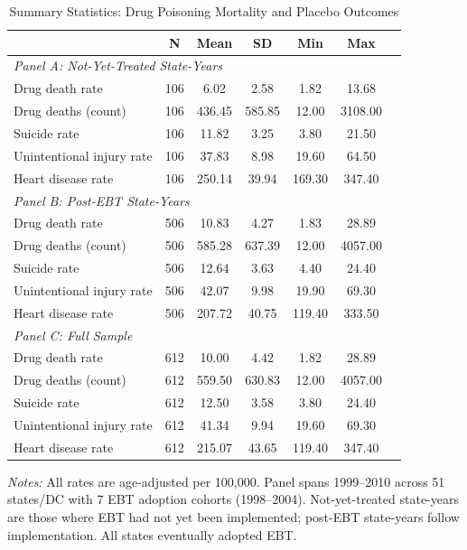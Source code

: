 \begin{table}[H]
\centering
\caption{Summary Statistics: Drug Poisoning Mortality and Placebo Outcomes}
\label{tab:summary}
\small
\begin{threeparttable}
\begin{tabular}{lcccccc}
\toprule
& N & Mean & SD & Min & Max \\
\midrule
\multicolumn{6}{l}{\textit{Panel A: Not-Yet-Treated State-Years}} \\
Drug death rate & 106 & 6.02 & 2.58 & 1.82 & 13.68 \\
Drug deaths (count) & 106 & 436.45 & 585.85 & 12.00 & 3108.00 \\
Suicide rate & 106 & 11.82 & 3.25 & 3.80 & 21.50 \\
Unintentional injury rate & 106 & 37.83 & 8.98 & 19.60 & 64.50 \\
Heart disease rate & 106 & 250.14 & 39.94 & 169.30 & 347.40 \\
\midrule
\multicolumn{6}{l}{\textit{Panel B: Post-EBT State-Years}} \\
Drug death rate & 506 & 10.83 & 4.27 & 1.83 & 28.89 \\
Drug deaths (count) & 506 & 585.28 & 637.39 & 12.00 & 4057.00 \\
Suicide rate & 506 & 12.64 & 3.63 & 4.40 & 24.40 \\
Unintentional injury rate & 506 & 42.07 & 9.98 & 19.90 & 69.30 \\
Heart disease rate & 506 & 207.72 & 40.75 & 119.40 & 333.50 \\
\midrule
\multicolumn{6}{l}{\textit{Panel C: Full Sample}} \\
Drug death rate & 612 & 10.00 & 4.42 & 1.82 & 28.89 \\
Drug deaths (count) & 612 & 559.50 & 630.83 & 12.00 & 4057.00 \\
Suicide rate & 612 & 12.50 & 3.58 & 3.80 & 24.40 \\
Unintentional injury rate & 612 & 41.34 & 9.94 & 19.60 & 69.30 \\
Heart disease rate & 612 & 215.07 & 43.65 & 119.40 & 347.40 \\
\bottomrule
\end{tabular}
\begin{tablenotes}[flushleft]
\footnotesize
\item \textit{Notes:} All rates are age-adjusted per 100,000. Panel spans 1999--2010 across 51 states/DC with 7 EBT adoption cohorts (1998--2004). Not-yet-treated state-years are those where EBT had not yet been implemented; post-EBT state-years follow implementation. All states eventually adopted EBT.
\end{tablenotes}
\end{threeparttable}
\end{table}
